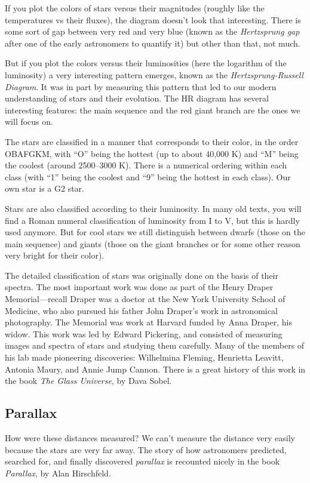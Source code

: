 \documentclass[12pt, preprint]{aastex}
\begin{document}
If you plot the colors of stars versus their magnitudes (roughly like
the temperatures vs their fluxes), the diagram doesn't look that
interesting. There is some sort of gap between very red and very blue
(known as the {\it Hertzsprung gap} after one of the early astronomers
to quantify it) but other than that, not much.

But if you plot the colors versus their luminosities (here the
logarithm of the luminosity) a very interesting pattern emerges, known
as the {\it Hertzsprung-Russell Diagram}. It was in part by measuring
this pattern that led to our modern understanding of stars and their
evolution. The HR diagram has several interesting features: the main
sequence and the red giant branch are the ones we will focus on.

The stars are classified in a manner that corresponds to their color,
in the order OBAFGKM, with ``O'' being the hottest (up to about 40,000
K) and ``M'' being the coolest (around 2500--3000 K). There is a
numerical ordering within each class (with ``1'' being the coolest and
``9'' being the hottest in each class). Our own star is a G2 star.

Stars are also classified according to their luminosity. In many old
texts, you will find a Roman numeral classification of luminosity from
I to V, but this is hardly used anymore. But for cool stars we still
distinguish between dwarfs (those on the main sequence) and giants
(those on the giant branches or for some other reason very bright for
their color).

The detailed classification of stars was originally done on the basis
of their spectra. The most important work was done as part of the
Henry Draper Memorial---recall Draper was a doctor at the New York
University School of Medicine, who also pursued his father John
Draper's work in astronomical photography. The Memorial was work at
Harvard funded by Anna Draper, his widow. This work was led by Edward
Pickering, and consisted of measuring images and spectra of stars and
studying them carefully. Many of the members of his lab made
pioneering discoveries: Wilhelmina Fleming, Henrietta Leavitt, Antonia
Maury, and Annie Jump Cannon. There is a great history of this work in
the book {\it The Glass Universe}, by Dava Sobel.

\subsection{Parallax}

How were these distances measured? We can't measure the distance very
easily because the stars are very far away. The story of how
astronomers predicted, searched for, and finally discovered {\it
  parallax} is recounted nicely in the book {\it Parallax}, by Alan
Hirschfeld.
\end{document}
